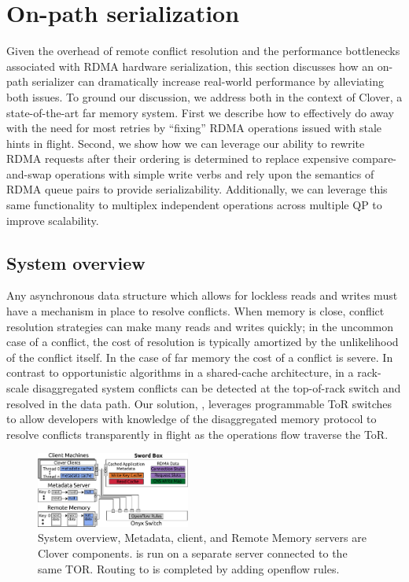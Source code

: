 \section{On-path serialization}

Given the overhead of remote conflict resolution and the performance
bottlenecks associated with RDMA hardware serialization, this section
discusses how an on-path serializer can dramatically increase
real-world performance by alleviating both issues.  To ground our
discussion, we address both in the context of Clover, a
state-of-the-art far memory system.  First we describe how to
effectively do away with the need for most retries by ``fixing'' RDMA
operations issued with stale hints in flight.  Second, we show how we
can leverage our ability to rewrite RDMA requests after their ordering
is determined to replace expensive compare-and-swap operations with
simple write verbs and rely upon the semantics of RDMA queue pairs to
provide serializability. Additionally, we can leverage this same
functionality to multiplex independent operations across multiple QP
to improve scalability.


\subsection{System overview}

Any asynchronous data structure which allows for lockless reads and
writes must have a mechanism in place to resolve conflicts. When
memory is close, conflict resolution strategies can make many reads
and writes quickly; in the uncommon case of a conflict, the cost of
resolution is typically amortized by the unlikelihood of the conflict
itself. In the case of far memory the cost of a conflict is severe. In
contrast to opportunistic algorithms in a shared-cache architecture,
in a rack-scale disaggregated system conflicts can be detected at the
top-of-rack switch and resolved in the data path. Our solution,
\sword, leverages programmable ToR switches to allow developers with
knowledge of the disaggregated memory protocol to resolve conflicts
transparently in flight as the operations flow traverse the ToR.

\begin{figure} \includegraphics[width=0.45\textwidth]{fig/overview_2.pdf}
\caption{ System overview, Metadata, client, and Remote Memory servers are
Clover components. \sword is run on a separate server connected to the same TOR.
Routing to \sword is completed by adding openflow rules.}
\label{fig:overview} \end{figure}


